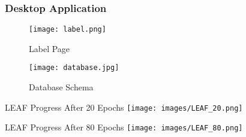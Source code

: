 \begin{frame}
    \frametitle{Desktop Application}

    \begin{figure}
        \centering
        \begin{minipage}{0.48\textwidth}
            \centering
            \texttt{[image: label.png]}
            \caption{Label Page}
        \end{minipage}
        \hfill
        \begin{minipage}{0.48\textwidth}
            \centering
            \texttt{[image: database.jpg]}
            \caption{Database Schema}
        \end{minipage}
    \end{figure}

\end{frame}


\begin{frame}{LEAF Progress}
    \centering
    After 20 Epochs
    \break
    \texttt{[image: images/LEAF\_20.png]}
\end{frame}

\begin{frame}{LEAF Progress}
    \centering
    After 80 Epochs
    \break
    \texttt{[image: images/LEAF\_80.png]}
\end{frame}